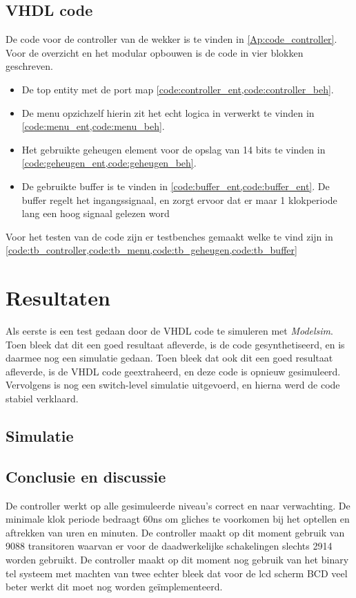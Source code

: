 \subsection{VHDL code}
De code voor de controller van de wekker is te vinden in \cref{Ap:code_controller}. Voor de overzicht en het modular opbouwen is de code in vier blokken geschreven.
\begin{itemize}[nolistsep]
\item De top entity met de port map \cref{code:controller_ent,code:controller_beh}.
\item De menu opzichzelf hierin zit het echt logica in verwerkt te vinden in \cref{code:menu_ent,code:menu_beh}.
\item Het gebruikte geheugen element voor de opslag van 14 bits te vinden in \cref{code:geheugen_ent,code:geheugen_beh}.
\item De gebruikte buffer is te vinden in \cref{code:buffer_ent,code:buffer_ent}. De buffer regelt het ingangssignaal, en zorgt ervoor dat er maar 1 klokperiode lang een hoog signaal gelezen word
\end{itemize}
Voor het testen van de code zijn er testbenches gemaakt welke te vind zijn in \cref{code:tb_controller,code:tb_menu,code:tb_geheugen,code:tb_buffer}
\section{Resultaten}
Als eerste is een test gedaan door de VHDL code te simuleren met \emph{Modelsim}. Toen bleek dat dit een goed resultaat afleverde, is de code gesynthetiseerd, en is daarmee nog een simulatie gedaan. Toen bleek dat ook dit een goed resultaat afleverde, is de VHDL code geextraheerd, en deze code is opnieuw gesimuleerd. Vervolgens is nog een switch-level simulatie uitgevoerd, en hierna werd de code stabiel verklaard.

\subsection{Simulatie}

\subsection{Conclusie en discussie}
De controller werkt op alle gesimuleerde niveau's correct en naar verwachting. De minimale klok periode bedraagt 60ns om gliches te voorkomen bij het optellen en aftrekken van uren en minuten. De controller maakt op dit moment gebruik van 9088 transitoren waarvan er voor de daadwerkelijke schakelingen slechts 2914 worden gebruikt. De controller maakt op dit moment nog gebruik van het binary tel systeem met machten van twee echter bleek dat voor de lcd scherm BCD veel beter werkt dit moet nog worden ge\"{i}mplementeerd.


